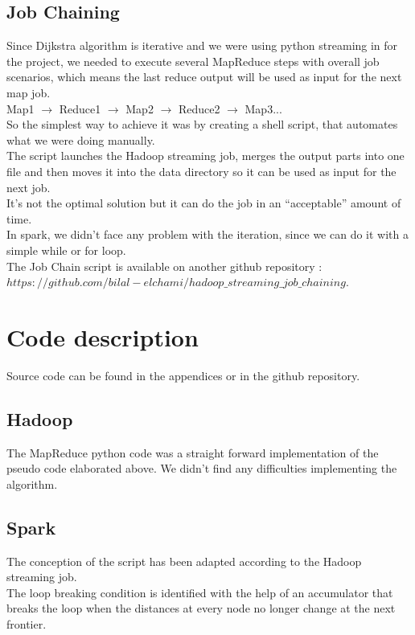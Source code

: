 \documentclass[english]{article}
\begin{document}
\newpage
\subsection{Job Chaining}
Since Dijkstra algorithm is iterative and we were using python streaming in for the project, we needed to execute several MapReduce steps with overall job scenarios, which means the last reduce output will be used as input for the next map job.\\

Map1 $\rightarrow$ Reduce1 $\rightarrow$ Map2 $\rightarrow$ Reduce2 $\rightarrow$ Map3... \\

So the simplest way to achieve it was by creating a shell script, that automates what we were doing manually.\\

The script launches the Hadoop streaming job, merges the output parts into one file and then moves it into the data directory so it can be used as input for the next job.\\

It’s not the optimal solution but it can do the job in an “acceptable” amount of time.\\

In spark, we didn't face any problem with the iteration, since we can do it with a simple while or for loop.\\

The Job Chain script is available on another github repository : \\
\href{https://github.com/bilal-elchami/hadoop_streaming_job_chaining}{$https://github.com/bilal-elchami/hadoop\_streaming\_job\_chaining$}.

\newpage
\section{Code description} 
Source code can be found in the appendices or in the github repository.\\
\subsection{Hadoop}
The MapReduce python code was a straight forward implementation of the pseudo code elaborated above. We didn't find any difficulties implementing the algorithm. 
\subsection{Spark}
The conception of the script has been adapted according to the Hadoop streaming job. \\
The loop breaking condition is identified with the help of an accumulator that breaks the loop when the distances at every node no longer change at the next frontier.\\
\end{document}
